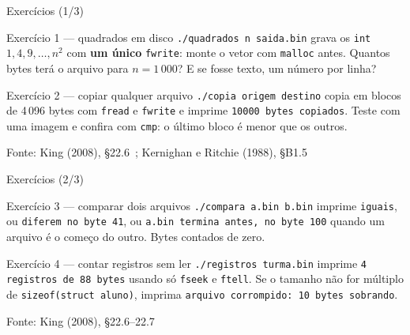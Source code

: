 \documentclass[aspectratio=169]{beamer}
\newcommand{\fonte}[1]{\vfill\hfill{\scriptsize\textcolor{UFSGray}{Fonte: #1}}}
\begin{document}
\begin{frame}{Exercícios (1/3)}
  \footnotesize
  \begin{block}{Exercício 1 --- quadrados em disco}
    \texttt{./quadrados n saida.bin} grava os \texttt{int} $1, 4, 9,
    \ldots, n^2$ com \textbf{um único} \texttt{fwrite}: monte o vetor com
    \texttt{malloc} antes. Quantos bytes terá o arquivo para
    $n = 1\,000$? E se fosse texto, um número por linha?
  \end{block}
  \begin{block}{Exercício 2 --- copiar qualquer arquivo}
    \texttt{./copia origem destino} copia em blocos de 4\,096 bytes com
    \texttt{fread} e \texttt{fwrite} e imprime \texttt{10000 bytes
    copiados}. Teste com uma imagem e confira com \texttt{cmp}: o último
    bloco é menor que os outros.
  \end{block}
  \fonte{King (2008), §22.6~\cite{king2008c};
    Kernighan e Ritchie (1988), §B1.5~\cite{kernighan1988c}}
\end{frame}

\begin{frame}{Exercícios (2/3)}
  \footnotesize
  \begin{block}{Exercício 3 --- comparar dois arquivos}
    \texttt{./compara a.bin b.bin} imprime \texttt{iguais}, ou
    \texttt{diferem no byte 41}, ou \texttt{a.bin termina antes, no byte
    100} quando um arquivo é o começo do outro. Bytes contados de zero.
  \end{block}
  \begin{block}{Exercício 4 --- contar registros sem ler}
    \texttt{./registros turma.bin} imprime \texttt{4 registros de 88
    bytes} usando só \texttt{fseek} e \texttt{ftell}. Se o tamanho não for
    múltiplo de \texttt{sizeof(struct aluno)}, imprima
    \texttt{arquivo corrompido: 10 bytes sobrando}.
  \end{block}
  \fonte{King (2008), §22.6--22.7~\cite{king2008c}}
\end{frame}
\end{document}
